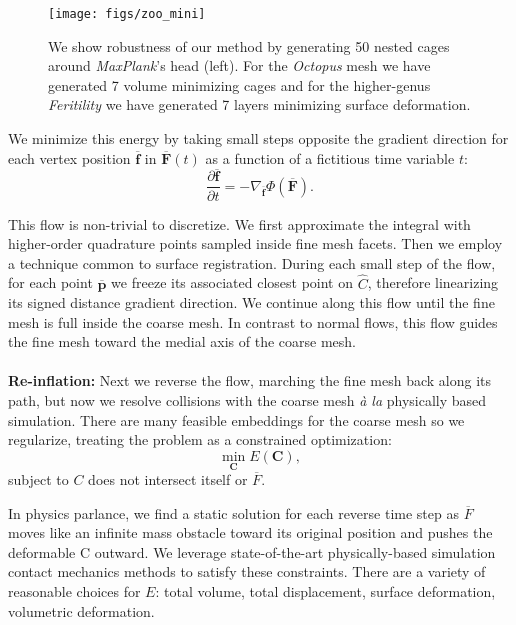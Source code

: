 \documentclass{cgyrf15}
\begin{document}

\begin{figure*}[t]
  \texttt{[image: figs/zoo\_mini]}
  \caption{We show robustness of our method by generating 50 nested cages
  around \emph{MaxPlank}'s head (left). For the \emph{Octopus} mesh we have
  generated 7 volume minimizing cages and for the higher-genus
  \emph{Feritility} we have generated 7 layers minimizing surface deformation.
  }
  \label{fig:minizoo}
\end{figure*}

We minimize this energy by taking small steps opposite the gradient direction
for each vertex position $\overline{\mathbf{f}}$ in $\overline{\mathbf{F}}(t)$
as a function of a fictitious time variable $t$:
\begin{equation}
\frac{\partial \overline{\mathbf{f}}}{\partial t} = - \nabla_{\overline{\mathbf{f}}} \Phi(\overline{\mathbf{F}}).
\label{eq:energy_gradient}
\end{equation}

This flow is non-trivial to discretize. We first approximate the integral with
higher-order quadrature points sampled inside fine mesh facets. Then we employ
a technique common to surface registration. During each small step of the flow,
for each point $\overline{\textbf{p}}$ we freeze its associated closest point
on $\hat{C}$, therefore linearizing its signed distance gradient direction. We
continue along this flow until the fine mesh is full inside the coarse mesh. In
contrast to normal flows, this flow guides the fine mesh toward the medial axis
of the coarse mesh. \\ \\ \textbf{Re-inflation:} Next we reverse the flow,
marching the fine mesh back along its path, but now we resolve collisions with
the coarse mesh \emph{\`{a} la} physically based simulation. There are many
feasible embeddings for the coarse mesh so we regularize, treating the problem
as a constrained optimization:
\begin{equation}
\min_{\mathbf{C}} E(\mathbf{C}),
\end{equation}
subject to $C$ does not intersect itself or $\overline{F}$.

In physics parlance, we find a static solution for each reverse time step as
$\overline{F}$ moves like an infinite mass obstacle toward its original
position and pushes the deformable C outward. We leverage state-of-the-art
physically-based simulation contact mechanics methods to satisfy these
constraints. There are a variety of reasonable choices for $E$: total volume,
total displacement, surface deformation, volumetric deformation.
\end{document}
